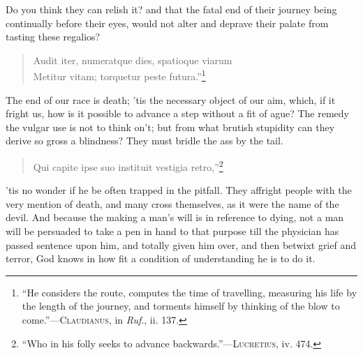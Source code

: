 \noindent Do you think they can relish it? and that the fatal end of
their journey being continually before their eyes, would not alter and
deprave their palate from tasting these regalios?

\begin{verse}
Audit iter, numeratque dies, spatioque viarum\\
Metitur vitam; torquetur peste futura.''\footnote{``He considers the
route, computes the time of travelling, measuring his life by the
length of the journey, and torments himself by thinking of the blow to
come.''---\textsc{Claudianus}, in \textit{Ruf}., ii. 137.}
\end{verse}

The end of our race is death; 'tis the necessary object of our aim,
which, if it fright us, how is it possible to advance a step without a
fit of ague? The remedy the vulgar use is not to think on't; but from
what brutish stupidity can they derive so gross a blindness? They must
bridle the ass by the tail.

\begin{verse}
Qui capite ipse suo instituit vestigia
retro,''\footnote{``Who in his folly seeks to advance
backwards.''---\textsc{Lucretius}, iv. 474.}
\end{verse}

\noindent 'tis no wonder if he be often trapped in the
pitfall. They affright people with the very mention of death, and many
cross themselves, as it were the name of the devil. And because the
making a man's will is in reference to dying, not a man will be
persuaded to take a pen in hand to that purpose till the physician has
passed sentence upon him, and totally given him over, and then betwixt
grief and terror, God knows in how fit a condition of understanding he
is to do it.

